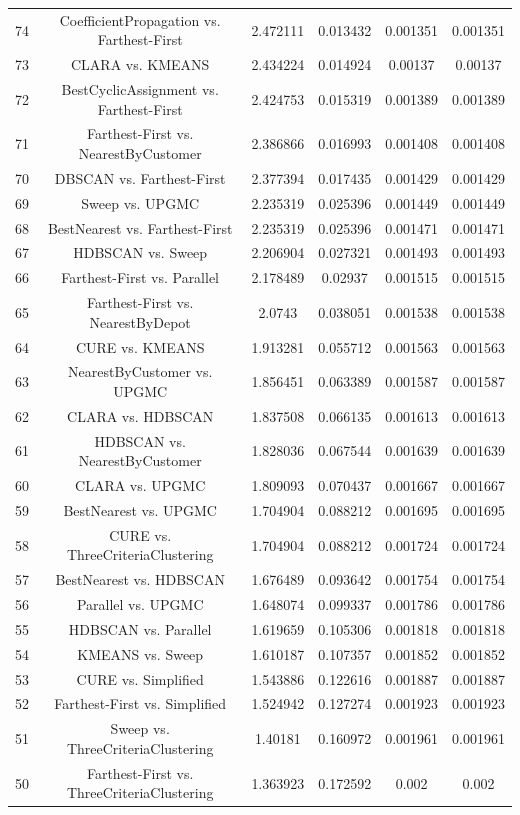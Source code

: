 \documentclass[a4paper,10pt]{article}
\begin{document}
\begin{landscape}
\begin{table}[!htp]
\begin{tabular}{cccccc}
74&CoefficientPropagation vs. Farthest-First&2.472111&0.013432&0.001351&0.001351\\
73&CLARA vs. KMEANS&2.434224&0.014924&0.00137&0.00137\\
72&BestCyclicAssignment vs. Farthest-First&2.424753&0.015319&0.001389&0.001389\\
71&Farthest-First vs. NearestByCustomer&2.386866&0.016993&0.001408&0.001408\\
70&DBSCAN vs. Farthest-First&2.377394&0.017435&0.001429&0.001429\\
69&Sweep vs. UPGMC&2.235319&0.025396&0.001449&0.001449\\
68&BestNearest vs. Farthest-First&2.235319&0.025396&0.001471&0.001471\\
67&HDBSCAN vs. Sweep&2.206904&0.027321&0.001493&0.001493\\
66&Farthest-First vs. Parallel&2.178489&0.02937&0.001515&0.001515\\
65&Farthest-First vs. NearestByDepot&2.0743&0.038051&0.001538&0.001538\\
64&CURE vs. KMEANS&1.913281&0.055712&0.001563&0.001563\\
63&NearestByCustomer vs. UPGMC&1.856451&0.063389&0.001587&0.001587\\
62&CLARA vs. HDBSCAN&1.837508&0.066135&0.001613&0.001613\\
61&HDBSCAN vs. NearestByCustomer&1.828036&0.067544&0.001639&0.001639\\
60&CLARA vs. UPGMC&1.809093&0.070437&0.001667&0.001667\\
59&BestNearest vs. UPGMC&1.704904&0.088212&0.001695&0.001695\\
58&CURE vs. ThreeCriteriaClustering&1.704904&0.088212&0.001724&0.001724\\
57&BestNearest vs. HDBSCAN&1.676489&0.093642&0.001754&0.001754\\
56&Parallel vs. UPGMC&1.648074&0.099337&0.001786&0.001786\\
55&HDBSCAN vs. Parallel&1.619659&0.105306&0.001818&0.001818\\
54&KMEANS vs. Sweep&1.610187&0.107357&0.001852&0.001852\\
53&CURE vs. Simplified&1.543886&0.122616&0.001887&0.001887\\
52&Farthest-First vs. Simplified&1.524942&0.127274&0.001923&0.001923\\
51&Sweep vs. ThreeCriteriaClustering&1.40181&0.160972&0.001961&0.001961\\
50&Farthest-First vs. ThreeCriteriaClustering&1.363923&0.172592&0.002&0.002\\

\end{tabular}
\end{table}
\end{landscape}
\end{document}
